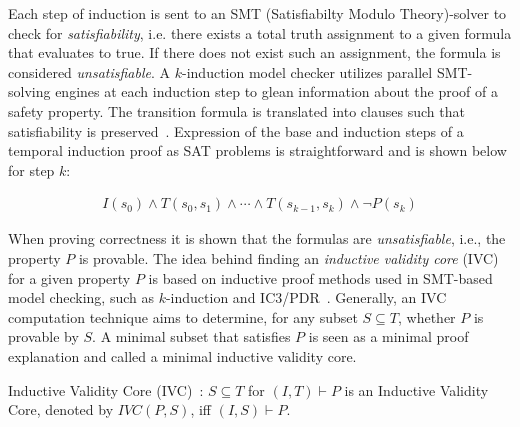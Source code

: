 Each step of induction is sent to an SMT (Satisfiabilty Modulo Theory)-solver to check for \emph{satisfiability}, i.e. there exists a total truth assignment to a given formula that evaluates to true. If there does not exist such an assignment, the formula is considered \emph{unsatisfiable}. %
A $\mathit{k}$-induction model checker utilizes parallel SMT-solving engines at each induction step to glean information about the proof of a safety property. The transition formula is translated into clauses such that satisfiability is preserved~\cite{een2003temporal}. Expression of the base and induction steps of a temporal induction proof as SAT problems is straightforward and is shown below for step $k$:

\begin{gather*}
I(s_0) \land T(s_0, s_1) \land \cdots \land T(s_{k-1}, s_{k})
\land \neg P(s_{k})
\end{gather*}

When proving correctness it is shown that the formulas are \emph{unsatisfiable}, i.e., the property $P$ is provable. The idea behind finding an {\em inductive validity core} (IVC) for a given property $P$ is based on inductive proof methods used in SMT-based model checking, such as $\mathit{k}$-induction and IC3/PDR~\cite{een2011efficient, kahsai2012incremental}. Generally, an IVC computation technique aims to determine, for any subset $S \subseteq T$, whether $\mathit{P}$ is provable by $\mathit{S}$. A minimal subset that satisfies $\mathit{P}$ is seen as a minimal proof explanation and called a minimal inductive validity core. %

\begin{definition}
Inductive Validity Core (IVC)~\cite{GhassabaniGW16}: $S \subseteq T$ for $(I, T) \vdash P$ is an Inductive Validity Core, denoted by $\mathit{IVC(P,S)}$, iff $\mathit{(I,S)} \vdash P$.
\end{definition}

